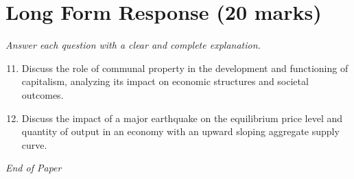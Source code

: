 \documentclass[12pt]{article}
\begin{document}
\section*{Long Form Response (20 marks)}
\textit{Answer each question with a clear and complete explanation.}
\begin{enumerate}[label=\arabic*.]
\setcounter{enumi}{10}
\item Discuss the role of communal property in the development and functioning of capitalism, analyzing its impact on economic structures and societal outcomes.
\item Discuss the impact of a major earthquake on the equilibrium price level and quantity of output in an economy with an upward sloping aggregate supply curve.
\end{enumerate}

\vfill
\noindent\textit{End of Paper}
\end{document}
